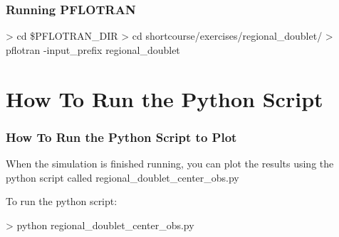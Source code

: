\documentclass{beamer}
\begin{document}
\begin{frame}[fragile]\frametitle{Running PFLOTRAN}

\begin{semiverbatim}

 > cd \$PFLOTRAN_DIR
 > cd shortcourse/exercises/regional_doublet/
  > pflotran -input_prefix regional_doublet

\end{semiverbatim}

\end{frame}

\section{How To Run the Python Script}

\begin{frame}[fragile]\frametitle{How To Run the Python Script to Plot}

When the simulation is finished running, you can plot the results using
the python script called regional\_doublet\_center\_obs.py

To run the python script:

\begin{semiverbatim}

 > python regional_doublet_center_obs.py

\end{semiverbatim}

\end{frame}
\end{document}
